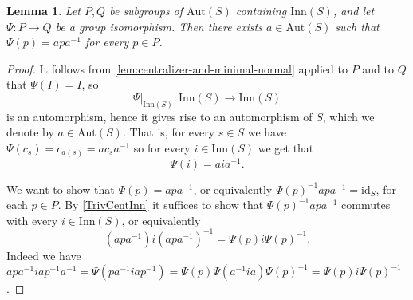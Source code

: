 \documentclass[10pt,a4paper]{amsart}
\newtheorem{lem}{Lemma}
\begin{document}
\begin{lem} \label{lem:rigidity}
Let $P,Q$ be subgroups of $\mathrm{Aut}(S)$ containing $\mathrm{Inn}(S)$, and let $\Psi \colon P\xrightarrow{}Q$ be a group isomorphism. Then there exists $a \in \mathrm{Aut}(S)$ such that $\Psi(p)=a p a^{-1}$ for every $p\in P$.
\end{lem}

\begin{proof}
It follows from \cref{lem:centralizer-and-minimal-normal} applied to $P$ and to $Q$ that $\Psi(I)=I$, so
\[ \Psi|_{\mathrm{Inn}(S)} \colon \mathrm{Inn}(S) \xrightarrow{} \mathrm{Inn}(S) \]
is an automorphism, hence it gives rise to an automorphism of $S$, which we denote by $a \in \mathrm{Aut}(S)$. That is, for every $s \in S$ we have $\Psi(c_s)=c_{a(s)}=a c_s a^{-1}$ so for every $i \in \mathrm{Inn}(S)$ we get that
\[ \Psi(i)=aia^{-1}. \]

We want to show that $\Psi(p) = apa^{-1}$, or equivalently $\Psi(p)^{-1} a p a^{-1} = \mathrm{id}_S$, for each $p \in P$. By \cref{TrivCentInn} it suffices to show that $\Psi(p)^{-1} a p a^{-1}$ commutes with every $i \in \mathrm{Inn}(S)$, or equivalently
\[ (a p a^{-1}) i (a p a^{-1})^{-1} = \Psi(p) i \Psi(p)^{-1}. \]
Indeed we have $a p a^{-1} i a p^{-1}a^{-1} = \Psi(p a^{-1} i a p^{-1}) = \Psi(p)\Psi(a^{-1} i a)\Psi(p)^{-1} = \Psi(p) i \Psi(p)^{-1}$.
\end{proof}
\end{document}

